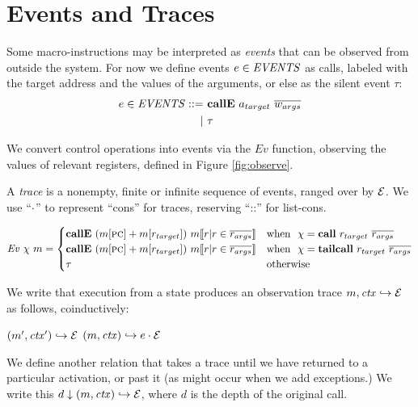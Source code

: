 \documentclass[10pt,conference]{ieeetran}%
\theoremstyle{definition}
\begin{document}
\section{Events and Traces}

Some macro-instructions may be interpreted as {\it events} that can be observed
from outside the system. For now we define events \(e \in \mathit{EVENTS}\) as calls, labeled
with the target address and the values of the arguments, or else as the silent
event \(\tau\):
\[\begin{split}
e \in \mathit{EVENTS} ::= & ~ \mathbf{callE} ~ a_{target} ~ \overline{w_{args}} \\
| & ~ \tau \\
\end{split}\]

We convert control operations into events via the \(Ev\)
function, observing the values of relevant registers, defined in Figure \ref{fig:observe}.

A {\em trace} is a nonempty, finite or infinite sequence
of events, ranged over by \(\mathcal{E}\).
We use ``\(\cdot\)'' to represent ``cons'' for traces, reserving ``::''
for list-cons.

\begin{figure*}
\[\mathit{Ev} ~ \chi ~ m =
\begin{cases}
  \mathbf{callE} ~ (m[\textsc{pc}]+m[r_{target}]) ~ m \llbracket r | r \in \overline{r_{args}} \rrbracket
  & \textnormal{when } ~ \chi = \mathbf{call} ~ r_{target} ~ \overline{r_{args}} \\
  \mathbf{callE} ~ (m[\textsc{pc}]+m[r_{target}]) ~ m \llbracket r | r \in \overline{r_{args}} \rrbracket
  & \textnormal{when } ~ \chi = \mathbf{tailcall} ~ r_{target} ~ \overline{r_{args}} \\
  \tau & \textnormal{otherwise} \\
\end{cases}\]
\caption{Converting overlay steps to events}
\label{fig:observe}
\end{figure*}

We write that execution from a state produces an observation trace
\(m,\mathit{ctx} \hookrightarrow \mathcal{E}\) as follows, coinductively:

            {\((m',\mathit{ctx}') \hookrightarrow \mathcal{E}\)}
            {\((m,\mathit{ctx}) \hookrightarrow e \cdot \mathcal{E}\)}

We define another relation that takes a trace until we have returned to a particular
activation, or past it (as might occur when we add exceptions.)
We write this \(d \downarrow (m,\mathit{ctx}) \hookrightarrow \mathcal{E}\), where
\(d\) is the depth of the original call.
\end{document}
